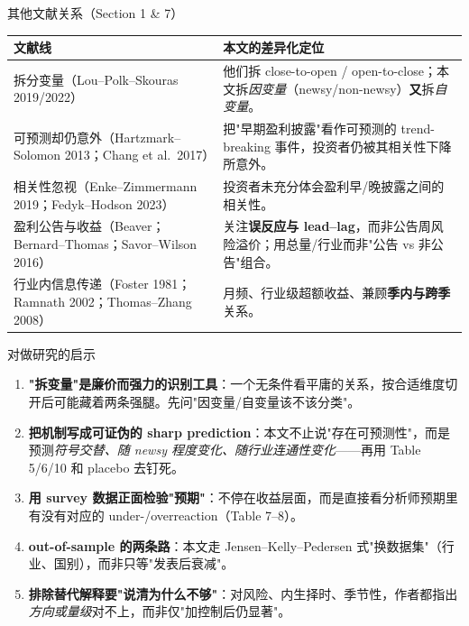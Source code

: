 \documentclass[aspectratio=169,10pt]{beamer}
\newcommand{\tighttable}{\scriptsize\setlength{\tabcolsep}{3pt}\renewcommand{\arraystretch}{1.12}}
\begin{document}
\begin{frame}{其他文献关系（Section 1 \& 7）}
	\tighttable
	\begin{tabularx}{\textwidth}{lY}
		\toprule
		文献线 & 本文的差异化定位 \\
		\midrule
		拆分变量（Lou--Polk--Skouras 2019/2022）& 他们拆 close-to-open / open-to-close；本文拆\emph{因变量}（newsy/non-newsy）\textbf{又}拆\emph{自变量}。 \\
		可预测却仍意外（Hartzmark--Solomon 2013；Chang et al.\ 2017）& 把"早期盈利披露"看作可预测的 trend-breaking 事件，投资者仍被其相关性下降所意外。 \\
		相关性忽视（Enke--Zimmermann 2019；Fedyk--Hodson 2023）& 投资者未充分体会盈利早/晚披露之间的相关性。 \\
		盈利公告与收益（Beaver；Bernard--Thomas；Savor--Wilson 2016）& 关注\textbf{误反应与 lead--lag}，而非公告周风险溢价；用总量/行业而非"公告 vs 非公告"组合。 \\
		行业内信息传递（Foster 1981；Ramnath 2002；Thomas--Zhang 2008）& 月频、行业级超额收益、兼顾\textbf{季内与跨季}关系。 \\
		\bottomrule
	\end{tabularx}
\end{frame}

\begin{frame}{对做研究的启示}
	\begin{enumerate}
		\item \textbf{"拆变量"是廉价而强力的识别工具}：一个无条件看平庸的关系，按合适维度切开后可能藏着两条强腿。先问"因变量/自变量该不该分类"。
		\item \textbf{把机制写成可证伪的 sharp prediction}：本文不止说"存在可预测性"，而是预测\emph{符号交替、随 newsy 程度变化、随行业连通性变化}——再用 Table 5/6/10 和 placebo 去钉死。
		\item \textbf{用 survey 数据正面检验"预期"}：不停在收益层面，而是直接看分析师预期里有没有对应的 under-/overreaction（Table 7--8）。
		\item \textbf{out-of-sample 的两条路}：本文走 Jensen--Kelly--Pedersen 式"换数据集"（行业、国别），而非只等"发表后衰减"。
		\item \textbf{排除替代解释要"说清为什么不够"}：对风险、内生择时、季节性，作者都指出\emph{方向或量级}对不上，而非仅"加控制后仍显著"。
	\end{enumerate}
\end{frame}
\end{document}
